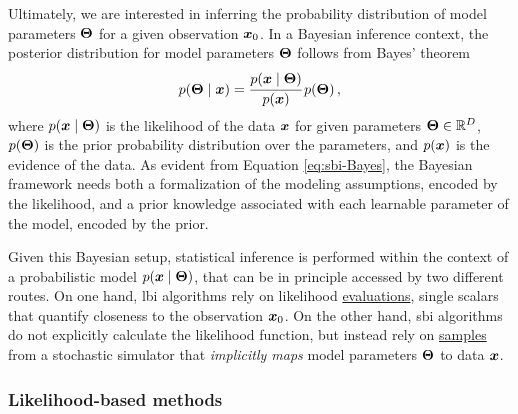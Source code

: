 Ultimately, we are interested in inferring the probability distribution of model parameters $\bm{\Theta}$ for a given observation $\bm{x}_0$. 
In a Bayesian inference context, the posterior distribution for model parameters $\bm{\Theta}$ follows from Bayes' theorem
\begin{equation} \label{eq:sbi-Bayes}
    p(\bm{\Theta}\mid\bm{x})=\cfrac{p(\bm{x}\mid\bm{\Theta})}{p(\bm{x})} \, p(\bm{\Theta}) \, ,
\end{equation}
where $p(\bm{x}\mid\bm{\Theta})$ is the likelihood of the data $\bm{x}$ for given parameters $\bm{\Theta} \in \mathbb{R}^D$, $p(\bm{\Theta})$ is the prior probability distribution over the parameters, and $p(\bm{x})$ is the evidence of the data.  
As evident from Equation \eqref{eq:sbi-Bayes}, the Bayesian framework needs both a formalization of the modeling assumptions, encoded by the likelihood, and a prior knowledge associated with each learnable parameter of the model, encoded by the prior. %
 
Given this Bayesian setup, statistical inference is performed within the context of a probabilistic model $p(\bm{x}\mid\bm{\Theta})$, that can be in principle accessed by two different routes. On one hand, \gls*{lbi} algorithms rely on likelihood \underline{evaluations}, single scalars that quantify closeness to the observation $\bm{x}_0$. On the other hand, \gls*{sbi} algorithms do not explicitly calculate the likelihood function, but instead rely on \underline{samples} from a stochastic simulator that \emph{implicitly maps} model parameters $\bm{\Theta}$ to data $\bm{x}$.

\subsubsection{Likelihood-based methods}

